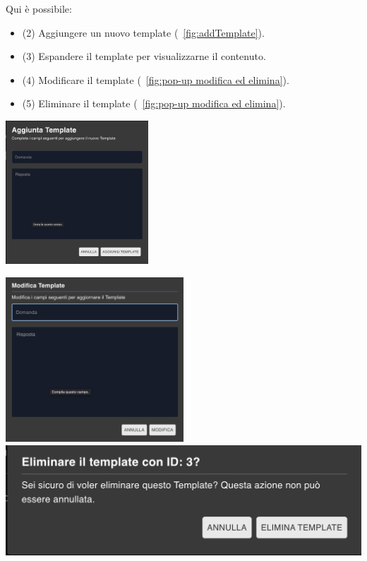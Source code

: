 Qui è possibile:
\begin{itemize}
    \item (2) Aggiungere un nuovo template (~\ref{fig:addTemplate}).
    \item (3) Espandere il template per visualizzarne il contenuto.
    \item (4) Modificare il template (~\ref{fig:pop-up modifica ed elimina}).
    \item (5) Eliminare il template (~\ref{fig:pop-up modifica ed elimina}).
\end{itemize}

\begin{center}
    \includegraphics[width=0.4\textwidth]{./img/AggiungiTemplate.png}
    \label{fig:addTemplate}
\end{center}

\begin{center}
    \includegraphics[width=0.5\textwidth]{./img/ModificaTemplate.png}
    \hspace{0.05\textwidth}
    \includegraphics[width=\textwidth]{./img/EliminaTemplate.png}
    \label{fig:pop-up modifica ed elimina}
\end{center}

